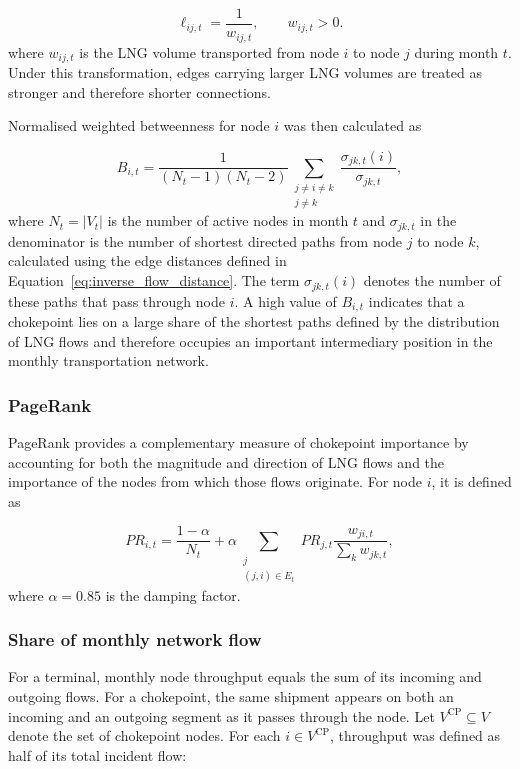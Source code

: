 \documentclass[pdftex,12pt,openright,a4paper,oneside]{book}
\begin{document}
\begin{equation}
\ell_{ij,t}
=
\frac{1}{w_{ij,t}},
\qquad
w_{ij,t}>0.
\label{eq:inverse_flow_distance}
\end{equation}
where \(w_{ij,t}\) is the LNG volume transported from node \(i\) to node \(j\) during month \(t\). 
Under this transformation, edges carrying larger LNG volumes are treated as stronger and therefore shorter connections.

Normalised weighted betweenness for node \(i\) was then calculated as

\begin{equation}
B_{i,t}
=
\frac{1}{(N_t-1)(N_t-2)}
\sum_{\substack{j\neq i\neq k \\ j\neq k}}
\frac{\sigma_{jk,t}(i)}
{\sigma_{jk,t}},
\label{eq:weighted_betweenness}
\end{equation}
where \(N_t=|V_t|\) is the number of active nodes in month \(t\) and \(\sigma_{jk,t}\) in the denominator is the number of shortest directed paths from node \(j\) to node \(k\), calculated using the edge distances defined in Equation~\ref{eq:inverse_flow_distance}. 
The term \(\sigma_{jk,t}(i)\) denotes the number of these paths that pass through node \(i\).
A high value of \(B_{i,t}\) indicates that a chokepoint lies on a large share of the shortest paths defined by the distribution of LNG flows and therefore occupies an important intermediary position in the monthly transportation network.

\subsubsection{PageRank}
PageRank provides a complementary measure of chokepoint importance by accounting for both the magnitude and direction of LNG flows and the importance of the nodes from which those flows originate.
For node \(i\), it is defined as

\begin{equation}
PR_{i,t}
=
\frac{1-\alpha}{N_t}
+
\alpha
\sum_{\substack{j \\ (j,i)\in E_t}}
PR_{j,t}
\frac{w_{ji,t}}
{\sum_k w_{jk,t}},
\label{eq:node_pagerank}
\end{equation}
where \(\alpha=0.85\) is the damping factor. 

\subsubsection{Share of monthly network flow}
For a terminal, monthly node throughput equals the sum of its incoming and outgoing flows. 
For a chokepoint, the same shipment appears on both an incoming and an outgoing segment as it passes through the node. 
Let \(V^{\mathrm{CP}}\subseteq V\) denote the set of chokepoint nodes.
For each \(i\in V^{\mathrm{CP}}\), throughput was defined as half of its total incident flow:
\end{document}
